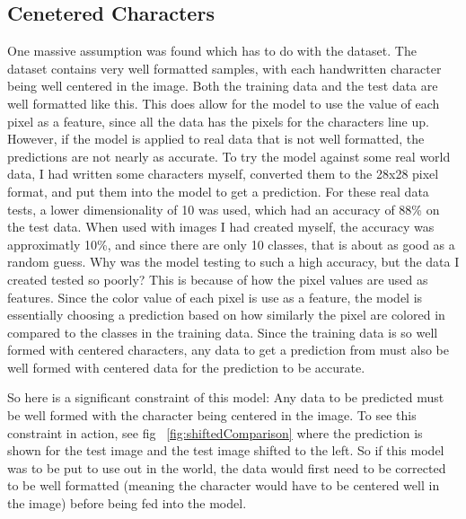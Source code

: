 \documentclass[12pt, twocolumn]{article}
\begin{document}
\subsection{ Cenetered Characters}
One massive assumption was found which has to do with the dataset. The dataset contains very well formatted samples, with each handwritten character being well centered in the image. Both the training data and the test data are well formatted like this. This does allow for the model to use the value of each pixel as a feature, since all the data has the pixels for the characters line up. However, if the model is applied to real data that is not well formatted, the predictions are not nearly as accurate. To try the model against some real world data, I had written some characters myself, converted them to the 28x28 pixel format, and put them into the model to get a prediction. For these real data tests, a lower dimensionality of 10 was used, which had an accuracy of 88\% on the test data. When used with images I had created myself, the accuracy was approximatly 10\%, and since there are only 10 classes, that is about as good as a random guess. Why was the model testing to such a high accuracy, but the data I created tested so poorly? This is because of how the pixel values are used as features. Since the color value of each pixel is use as a feature, the model is essentially choosing a prediction based on how similarly the pixel are colored in compared to the classes in the training data. Since the training data is so well formed with centered characters, any data to get a prediction from must also be well formed with centered data for the prediction to be accurate.

So here is a significant constraint of this model: Any data to be predicted must be well formed with the character being centered in the image. To see this constraint in action, see fig ~\ref{fig:shiftedComparison} where the prediction is shown for the test image and the test image shifted to the left. So if this model was to be put to use out in the world, the data would first need to be corrected to be well formatted (meaning the character would have to be centered well in the image) before being fed into the model.
\end{document}
